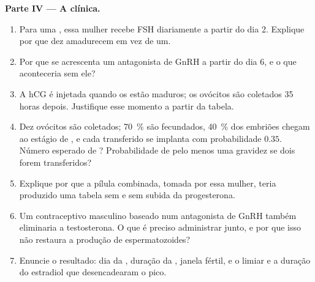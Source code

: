 \begin{problem}
\medskip
\noindent\textbf{Parte IV --- A clínica.}
\begin{enumerate}[resume]
  \item Para uma , essa mulher recebe FSH
        diariamente a partir do dia 2. Explique por que dez 
        amadurecem em vez de um.
  \item Por que se acrescenta um antagonista de GnRH a partir do dia 6,
        e o que aconteceria sem ele?
  \item A hCG é injetada quando os  estão maduros; os ovócitos
        são coletados 35 horas depois. Justifique esse momento a partir
        da tabela.
  \item Dez ovócitos são coletados; \qty{70}{\%} são fecundados,
        \qty{40}{\%} dos embriões chegam ao estágio de , e
        cada  transferido se implanta com probabilidade
        $0.35$. Número esperado de ? Probabilidade de pelo
        menos uma gravidez se dois forem transferidos?
  \item Explique por que a pílula combinada, tomada por essa mulher,
        teria produzido uma tabela sem  e sem subida da
        progesterona.
  \item Um contraceptivo masculino baseado num antagonista de GnRH
        também eliminaria a testosterona. O que é preciso administrar
        junto, e por que isso não restaura a produção de
        espermatozoides?
  \item Enuncie o resultado: dia da , duração da ,
        janela fértil, e o limiar e a duração do estradiol que
        desencadearam o pico.
\end{enumerate}
\end{problem}
